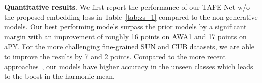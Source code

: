 \documentclass[10pt,twocolumn,letterpaper]{article}
\newcommand{\model}{TAFE-Net\xspace}
\newcommand\minisection[1]{\vspace{2mm}\noindent \textbf{#1}}
\begin{document}
\begin{table}[h]
\small
\centering
\caption{Datasets used in GZSL}
\vspace{-1em}
\addtolength{\tabcolsep}{-1pt}
\label{tab:datasets}
\end{table}\minisection{Quantitative results}. We first report the performance of our \model w/o the proposed embedding loss in Table~\ref{tab:zs_1} compared to the non-generative models. Our best performing models surpass 
 the prior models by a significant margin with an improvement of roughly 16 points on AWA1 and 17 points on aPY.
 For the more challenging fine-grained SUN and CUB datasets, we are able to improve the results by 7 and 2 
 points. Compared to the more recent approaches~\cite{zhang2017learning, yang2018learning}, our models have higher accuracy in the unseen classes which leads to the boost in the harmonic mean. 
\end{document}
